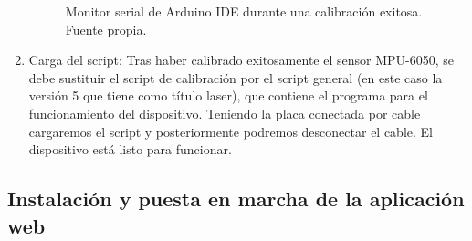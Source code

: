 \begin{enumerate}
\begin{figure}[h]
        \caption{Monitor serial de Arduino IDE durante una calibración exitosa. Fuente propia.}
        \label{fig:calibracion}
    \end{figure}
    \item Carga del script: Tras haber calibrado exitosamente el sensor MPU-6050, se debe sustituir el script de calibración por el script general (en este caso la versión 5 que tiene como título laser), que contiene el programa para el funcionamiento del dispositivo. Teniendo la placa conectada por cable cargaremos el script y posteriormente podremos desconectar el cable. El dispositivo está listo para funcionar.
\end{enumerate}
\subsection{Instalación y puesta en marcha de la aplicación web}
